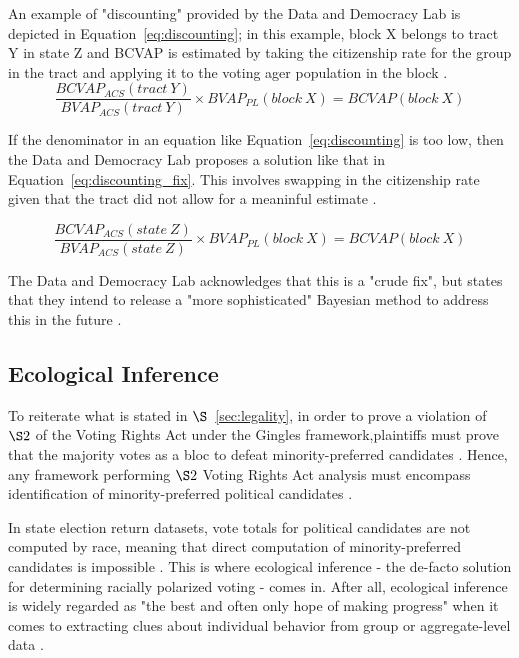 \documentclass[sn-vancouver,Numbered]{sn-jnl}
\theoremstyle{thmstyleone}%
\theoremstyle{thmstyletwo}%
\theoremstyle{thmstylethree}%
\begin{document}
An example of "discounting" provided by the Data and Democracy Lab is depicted in Equation~\ref{eq:discounting}; in this example, block X belongs to tract Y in state Z and BCVAP is estimated by taking the citizenship rate for the group in the tract and applying it to the voting ager population in the block \cite{mggg_vap_cvap}.
\begin{equation}
\frac{BCVAP_{ACS}(tract \: Y)}{BVAP_{ACS}(tract \: Y)} \times BVAP_{PL}(block \: X) = BCVAP(block \: X)
\label{eq:discounting}
\end{equation}

If the denominator in an equation like Equation~\ref{eq:discounting} is too low, then the Data and Democracy Lab proposes a solution like that in Equation~\ref{eq:discounting_fix}. This involves swapping in the citizenship rate given that the tract did not allow for a meaninful estimate \cite{mggg_vap_cvap}.

\begin{equation}
\frac{BCVAP_{ACS}(state \: Z)}{BVAP_{ACS}(state \: Z)} \times BVAP_{PL}(block \: X) = BCVAP(block \: X)
\label{eq:discounting_fix}
\end{equation}

The Data and Democracy Lab acknowledges that this is a "crude fix", but states that they intend to release a "more sophisticated" Bayesian method to address this in the future \cite{mggg_vap_cvap}. 

\subsection{Ecological Inference}
To reiterate what is stated in $\S$~\ref{sec:legality}, in order to prove a violation of $\S2$ of the Voting Rights Act under the Gingles framework,plaintiffs must prove that the majority votes as a bloc to defeat minority-preferred candidates \cite{thornburg1986gingles}. Hence, any framework performing $\S2$ Voting Rights Act analysis must encompass identification of minority-preferred political candidates \cite{BeckerDuchinGoldHirsch2021}.

In state election return datasets, vote totals for political candidates are not computed by race, meaning that direct computation of minority-preferred candidates is impossible \cite{BeckerDuchinGoldHirsch2021}. This is where ecological inference - the de-facto solution for determining racially polarized voting - comes in. After all, ecological inference is widely regarded as "the best and often only hope of making progress" when it comes to extracting clues about individual behavior from group or aggregate-level data \cite{king2004ecological}.
\end{document}
